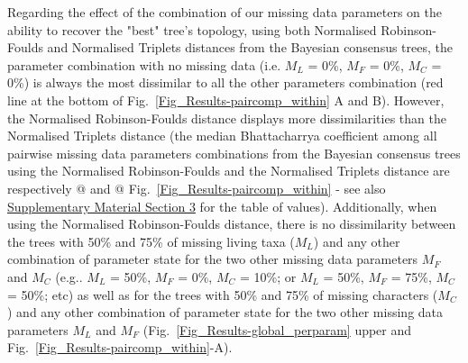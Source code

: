 \documentclass[12pt,letterpaper]{article}
\begin{document}
Regarding the effect of the combination of our missing data parameters on the ability to recover the "best" tree's topology, using both Normalised Robinson-Foulds and Normalised Triplets distances from the Bayesian consensus trees, the parameter combination with no missing data (i.e. $M_{L}$ = 0\%, $M_{F}$ = 0\%, $M_{C}$ = 0\%) is always the most dissimilar to all the other parameters combination (red %
 line at the bottom of Fig.~\ref{Fig_Results-paircomp_within} A and B). However, the Normalised Robinson-Foulds distance displays more dissimilarities than the Normalised Triplets distance (the median Bhattacharrya coefficient among all pairwise missing data parameters combinations from the Bayesian consensus trees using the Normalised Robinson-Foulds and the Normalised Triplets distance are respectively @ and @ %
 Fig.~\ref{Fig_Results-paircomp_within} - see also \hyperref[SupplementaryMaterial]{Supplementary Material Section 3} for the table of values). Additionally, when using the Normalised Robinson-Foulds distance, there is no dissimilarity between the trees with 50\% and 75\% of missing living taxa ($M_{L}$) and any other combination of parameter state for the two other missing data parameters $M_{F}$ and $M_{C}$ (e.g.. $M_{L}$ = 50\%, $M_{F}$ = 0\%, $M_{C}$ = 10\%; or $M_{L}$ = 50\%, $M_{F}$ = 75\%, $M_{C}$ = 50\%; etc) as well as for the trees with 50\% and 75\% of missing characters ($M_{C}$) and any other combination of parameter state for the two other missing data parameters $M_{L}$ and $M_{F}$ (Fig.~\ref{Fig_Results-global_perparam} upper and Fig.~\ref{Fig_Results-paircomp_within}-A).

%
%

\end{document}
